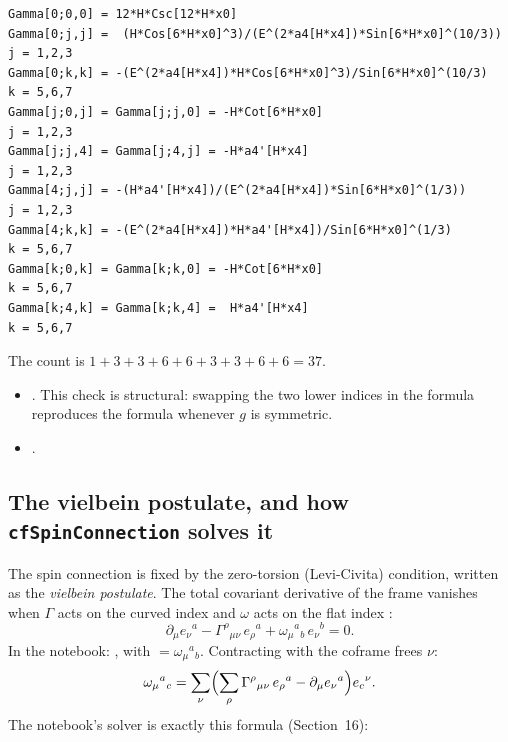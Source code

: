 {\scriptsize
\begin{verbatim}
Gamma[0;0,0] = 12*H*Csc[12*H*x0]
Gamma[0;j,j] =  (H*Cos[6*H*x0]^3)/(E^(2*a4[H*x4])*Sin[6*H*x0]^(10/3))   j = 1,2,3
Gamma[0;k,k] = -(E^(2*a4[H*x4])*H*Cos[6*H*x0]^3)/Sin[6*H*x0]^(10/3)      k = 5,6,7
Gamma[j;0,j] = Gamma[j;j,0] = -H*Cot[6*H*x0]                             j = 1,2,3
Gamma[j;j,4] = Gamma[j;4,j] = -H*a4'[H*x4]                               j = 1,2,3
Gamma[4;j,j] = -(H*a4'[H*x4])/(E^(2*a4[H*x4])*Sin[6*H*x0]^(1/3))         j = 1,2,3
Gamma[4;k,k] = -(E^(2*a4[H*x4])*H*a4'[H*x4])/Sin[6*H*x0]^(1/3)           k = 5,6,7
Gamma[k;0,k] = Gamma[k;k,0] = -H*Cot[6*H*x0]                             k = 5,6,7
Gamma[k;4,k] = Gamma[k;k,4] =  H*a4'[H*x4]                               k = 5,6,7
\end{verbatim}
}
\noindent The count is $1+3+3+6+6+3+3+6+6=37$.
\begin{itemize}
  \item {} . This check is structural: swapping the two lower indices in the formula reproduces the formula whenever $g$ is symmetric.
  \item {} .
\end{itemize}

\subsection{The vielbein postulate, and how \texorpdfstring{\texttt{cfSpinConnection}}{cfSpinConnection} solves it}
\label{csc:postulate}\label{sec:9.5}

The spin connection is fixed by the zero-torsion (Levi-Civita) condition, written as the
\emph{vielbein postulate}. The total covariant derivative of the frame vanishes when $\Gamma$ acts
on the curved index and $\omega$ acts on the flat index :
\begin{equation}
  \partial_\mu e_\nu{}^a-\Gamma^\rho{}_{\mu\nu}\,e_\rho{}^a+\omega_\mu{}^a{}_b\,e_\nu{}^b=0 .
\end{equation}
In the notebook: ,
with  $=\omega_\mu{}^a{}_b$. Contracting with the coframe frees $\nu$:
\begin{equation}
  \omega_\mu{}^a{}_c=\sum_\nu\Bigl(\sum_\rho\Gamma^\rho{}_{\mu\nu}\,e_\rho{}^a-\partial_\mu e_\nu{}^a\Bigr)e_c{}^\nu .
\end{equation}
The notebook's solver is exactly this formula (Section~16):


